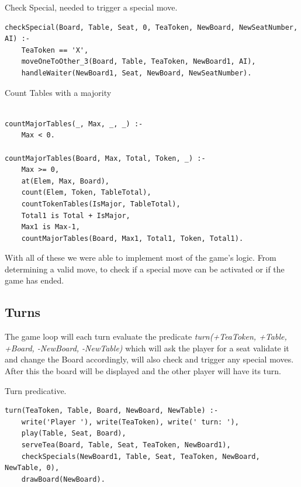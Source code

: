 \documentclass[a4paper]{article}
\begin{document}
        \begin{listing}[H]
        \caption{Check Special, needed to trigger a special move.}
        \label{Codigo:cod_chekspecial}
        \begin{verbatim}
checkSpecial(Board, Table, Seat, 0, TeaToken, NewBoard, NewSeatNumber, AI) :-
    TeaToken == 'X',
    moveOneToOther_3(Board, Table, TeaToken, NewBoard1, AI),
    handleWaiter(NewBoard1, Seat, NewBoard, NewSeatNumber).

        \end{verbatim}

        \end{listing}

        \begin{listing}[H]
        \caption{Count Tables with a majority}
        \label{Codigo:cod_major}
        \begin{verbatim}

countMajorTables(_, Max, _, _) :-
    Max < 0.

countMajorTables(Board, Max, Total, Token, _) :-
    Max >= 0,
    at(Elem, Max, Board),
    count(Elem, Token, TableTotal),
    countTokenTables(IsMajor, TableTotal),
    Total1 is Total + IsMajor,
    Max1 is Max-1,
    countMajorTables(Board, Max1, Total1, Token, Total1).

        \end{verbatim}

        \end{listing}


With all of these we were able to implement most of the game's logic. From determining a valid move,
to check if a special move can be activated or if the game has ended.


\subsection{Turns}

The game loop will each turn evaluate the predicate \textit{turn(+TeaToken, +Table, +Board, -NewBoard, -NewTable)}
 which will ask the player for a seat validate it and change the Board accordingly, will also check and trigger any special moves.
  After this the board will be displayed
  and the other player will have its turn.

    \begin{listing}[H]
            \caption{Turn predicative.}
            \label{Codigo:cod_turn}
            \begin{verbatim}
turn(TeaToken, Table, Board, NewBoard, NewTable) :-
    write('Player '), write(TeaToken), write(' turn: '),
    play(Table, Seat, Board),
    serveTea(Board, Table, Seat, TeaToken, NewBoard1),
    checkSpecials(NewBoard1, Table, Seat, TeaToken, NewBoard, NewTable, 0),
    drawBoard(NewBoard).

    \end{verbatim}

    \end{listing}
\end{document}
